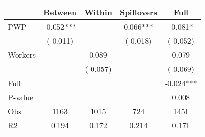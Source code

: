 
\begin{tabular}{l*{4}{c}}\hline&\multicolumn{1}{c}{Between}&\multicolumn{1}{c}{Within}&\multicolumn{1}{c}{Spillovers}&\multicolumn{1}{c}{Full}\\ \hline
 PWP           &             -0.052***      &                                               &        0.066*** &        -0.081*                            \\ 
                               &        (       0.011)           &                                       &       (       0.018)     &      (       0.052)                                           \\ 
 Workers       &                                               &        0.089    &                                &             0.079                            \\ 
                               &                                               & (       0.057)                  &                                        &      (       0.069)                                           \\ 
\hline                                                                                                                                                                                                                                            
 Full                  &                                               &                                               &                                        &            -0.024***                                     \\ 
 P-value               &                                               &                                               &                                        &             0.008                                           \\ 
 Obs                   &               1163               &       1015                       &       724                &              1451                                               \\ 
 R2                    &                      0.194              &              0.172                      &              0.214               &                     0.171                                              \\ 
\hline \end{tabular}                                                                                                                                                                                                              